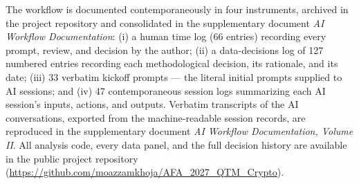 \documentclass[12pt]{article}
\begin{document}
The workflow is documented contemporaneously in four instruments, archived in the
project repository and consolidated in the supplementary document \textit{AI Workflow
Documentation}: (i) a human time log (66 entries) recording every prompt, review, and
decision by the author; (ii) a data-decisions log of 127 numbered entries recording
each methodological decision, its rationale, and its date; (iii) 33 verbatim kickoff
prompts --- the literal initial prompts supplied to AI sessions; and (iv) 47
contemporaneous session logs summarizing each AI session's inputs, actions, and
outputs. Verbatim transcripts of the AI conversations, exported from the
machine-readable session records, are reproduced in the supplementary document
\textit{AI Workflow Documentation, Volume II}. All analysis code, every data panel, and the full decision
history are available in the public project repository
(\url{https://github.com/moazzamkhoja/AFA_2027_QTM_Crypto}).
\end{document}

